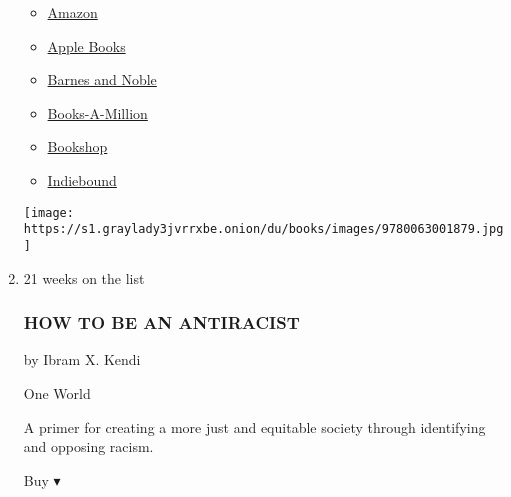\begin{enumerate}
  \begin{itemize}
  \tightlist
  \item
    \href{https://www.amazon.com/dp/006300187X?tag=NYTBSREV-20\&tag=NYTBS-20}{Amazon}
  \item
    \href{https://du-gae-books-dot-nyt-du-prd.appspot.com/buy?title=HOW+TO+DESTROY+AMERICA+IN+THREE+EASY+STEPS\&author=Ben+Shapiro}{Apple
    Books}
  \item
    \href{https://www.anrdoezrs.net/click-7990613-11819508?url=https\%3A\%2F\%2Fwww.barnesandnoble.com\%2Fw\%2F\%3Fean\%3D9780063001879}{Barnes
    and Noble}
  \item
    \href{https://www.anrdoezrs.net/click-7990613-35140?url=https\%3A\%2F\%2Fwww.booksamillion.com\%2Fp\%2FHOW\%2BTO\%2BDESTROY\%2BAMERICA\%2BIN\%2BTHREE\%2BEASY\%2BSTEPS\%2FBen\%2BShapiro\%2F9780063001879}{Books-A-Million}
  \item
    \href{https://bookshop.org/a/3546/9780063001879}{Bookshop}
  \item
    \href{https://www.indiebound.org/book/9780063001879?aff=NYT}{Indiebound}
  \end{itemize}

  \texttt{[image: https://s1.graylady3jvrrxbe.onion/du/books/images/9780063001879.jpg]}
\item
  \href{https://www.nytimes3xbfgragh.onion/2019/08/20/books/review/how-to-be-an-antiracist-ibram-x-kendi.html}{}

  21 weeks on the list

  \hypertarget{how-to-be-an-antiracist}{%
  \subsubsection{HOW TO BE AN
  ANTIRACIST}\label{how-to-be-an-antiracist}}

  by Ibram X. Kendi

  One World

  A primer for creating a more just and equitable society through
  identifying and opposing racism.

  Buy ▾


\end{enumerate}

